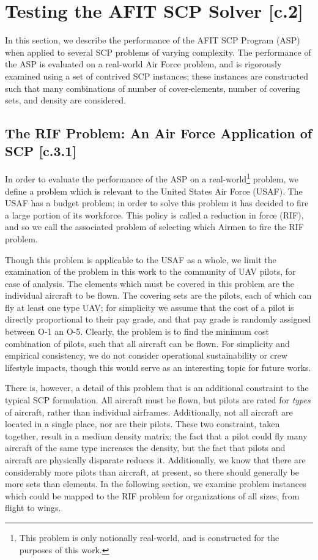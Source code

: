 \documentclass[12pt]{article}
\begin{document}
\section{Testing the AFIT SCP Solver [c.2]} \label{scn:testing}

In this section, we describe the performance of the AFIT SCP Program (ASP) when applied to several SCP problems of varying complexity. The performance of the ASP is evaluated on a real-world Air Force problem, and is rigorously examined using a set of contrived SCP instances; these instances are constructed such that many combinations of number of cover-elements, number of covering sets, and density are considered. 

\subsection{The RIF Problem: An Air Force Application of SCP [c.3.1]} \label{scn:testing_usaf}

In order to evaluate the performance of the ASP on a real-world\footnote{This problem is only notionally real-world, and is constructed for the purposes of this work.} problem, we define a problem which is relevant to the United States Air Force (USAF). The USAF has a budget problem; in order to solve this problem it has decided to fire a large portion of its workforce. This policy is called a reduction in force (RIF), and so we call the associated problem of selecting which Airmen to fire the RIF problem.

Though this problem is applicable to the USAF as a whole, we limit the examination of the problem in this work to the community of UAV pilots, for ease of analysis. The elements which must be covered in this problem are the individual aircraft to be flown. The covering sets are the pilots, each of which can fly at least one type UAV; for simplicity we assume that the cost of a pilot is directly proportional to their pay grade, and that pay grade is randomly assigned between O-1 an O-5. Clearly, the problem is to find the minimum cost combination of pilots, such that all aircraft can be flown. For simplicity and empirical consistency, we do not consider operational sustainability or crew lifestyle impacts, though this would serve as an interesting topic for future works. 

There is, however, a detail of this problem that is an additional constraint to the typical SCP formulation. All aircraft must be flown, but pilots are rated for \emph{types} of aircraft, rather than individual airframes. Additionally, not all aircraft are located in a single place, nor are their pilots. These two constraint, taken together, result in a medium density matrix; the fact that a pilot could fly many aircraft of the same type increases the density, but the fact that pilots and aircraft are physically disparate reduces it. Additionally, we know that there are considerably more pilots than aircraft, at present, so there should generally be more sets than elements. In the following section, we examine problem instances which could be mapped to the RIF problem for organizations of all sizes, from flight to wings. 
\end{document}
